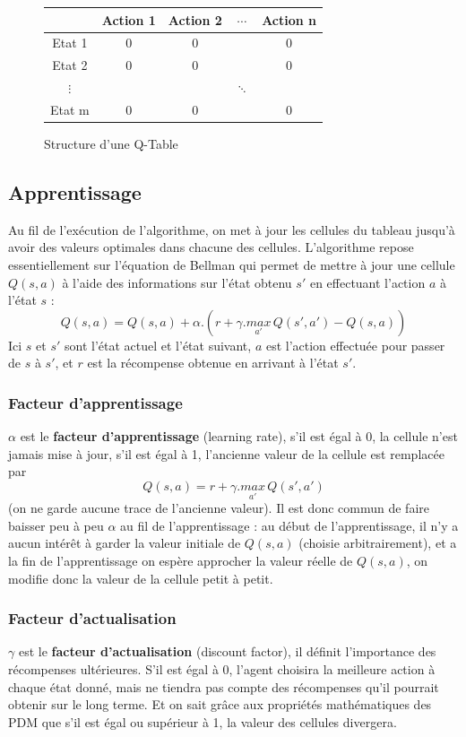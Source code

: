 \begin{figure}
\centering
\begin{tabular}{| c | c | c | c | c |}
    \hline
    & Action 1 & Action 2 & $\cdots$ & Action n\\ \hline
    Etat 1 & 0 & 0 & & 0 \\ \hline
    Etat 2 & 0 & 0 & & 0 \\ \hline
    $\vdots$ & & & $\ddots$ & \\ \hline
    Etat m & 0 & 0 & & 0 \\ \hline
\end{tabular}
\caption{Structure d'une Q-Table}
\end{figure}


\subsection{Apprentissage}
Au fil de l'exécution de l'algorithme, on met à jour les cellules du tableau jusqu'à avoir des valeurs optimales dans chacune des cellules.
L'algorithme repose essentiellement sur l'équation de Bellman qui permet de mettre à jour une cellule $Q(s,a)$ à l'aide des informations sur l'état obtenu $s'$ en effectuant l'action $a$ à l'état $s$ :
\[
    Q(s,a) = Q(s,a) + \alpha . \left( r + \gamma . \underset{a'}{max}\, Q(s',a') - Q(s,a) \right)
\]
Ici $s$ et $s'$ sont l'état actuel et l'état suivant, $a$ est l'action effectuée pour passer de $s$ à $s'$, et $r$ est la récompense obtenue en arrivant à l'état $s'$. \par

\subsubsection{Facteur d'apprentissage}
$\alpha$ est le \textbf{facteur d'apprentissage} (learning rate), s'il est égal à 0, la cellule n'est jamais mise à jour, s'il est égal à 1, l'ancienne valeur de la cellule est remplacée par 
\[Q(s,a) = r + \gamma . \underset{a'}{max}\, Q(s',a')\]
(on ne garde aucune trace de l'ancienne valeur).
Il est donc commun de faire baisser peu à peu $\alpha$ au fil de l'apprentissage : au début de l'apprentissage, il n'y a aucun intérêt à garder la valeur initiale de $Q(s,a)$ (choisie arbitrairement), et a la fin de l'apprentissage on espère approcher la valeur réelle de $Q(s,a)$, on modifie donc la valeur de la cellule petit à petit.

\subsubsection{Facteur d'actualisation}
$\gamma$ est le \textbf{facteur d'actualisation} (discount factor), il définit l'importance des récompenses ultérieures. S'il est égal à 0, l'agent choisira la meilleure action à chaque état donné, mais ne tiendra pas compte des récompenses qu'il pourrait obtenir sur le long terme. Et on sait grâce aux propriétés mathématiques des PDM que s'il est égal ou supérieur à 1, la valeur des cellules divergera.

